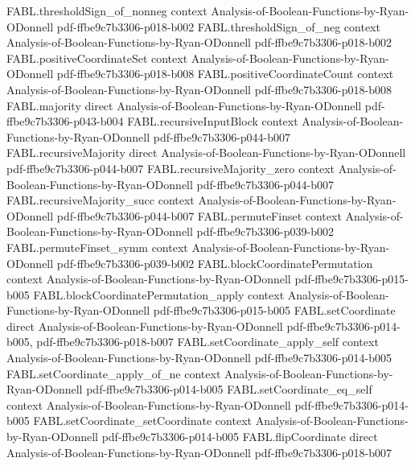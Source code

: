 \begin{theorem}
  {FABL.thresholdSign_of_nonneg}
  {context}
  {Analysis-of-Boolean-Functions-by-Ryan-ODonnell}
  {pdf-ffbe9c7b3306-p018-b002}
\proofstep
  {FABL.thresholdSign_of_neg}
  {context}
  {Analysis-of-Boolean-Functions-by-Ryan-ODonnell}
  {pdf-ffbe9c7b3306-p018-b002}
\proofstep
  {FABL.positiveCoordinateSet}
  {context}
  {Analysis-of-Boolean-Functions-by-Ryan-ODonnell}
  {pdf-ffbe9c7b3306-p018-b008}
\proofstep
  {FABL.positiveCoordinateCount}
  {context}
  {Analysis-of-Boolean-Functions-by-Ryan-ODonnell}
  {pdf-ffbe9c7b3306-p018-b008}
\proofstep
  {FABL.majority}
  {direct}
  {Analysis-of-Boolean-Functions-by-Ryan-ODonnell}
  {pdf-ffbe9c7b3306-p043-b004}
\proofstep
  {FABL.recursiveInputBlock}
  {context}
  {Analysis-of-Boolean-Functions-by-Ryan-ODonnell}
  {pdf-ffbe9c7b3306-p044-b007}
\proofstep
  {FABL.recursiveMajority}
  {direct}
  {Analysis-of-Boolean-Functions-by-Ryan-ODonnell}
  {pdf-ffbe9c7b3306-p044-b007}
\proofstep
  {FABL.recursiveMajority_zero}
  {context}
  {Analysis-of-Boolean-Functions-by-Ryan-ODonnell}
  {pdf-ffbe9c7b3306-p044-b007}
\proofstep
  {FABL.recursiveMajority_succ}
  {context}
  {Analysis-of-Boolean-Functions-by-Ryan-ODonnell}
  {pdf-ffbe9c7b3306-p044-b007}
\proofstep
  {FABL.permuteFinset}
  {context}
  {Analysis-of-Boolean-Functions-by-Ryan-ODonnell}
  {pdf-ffbe9c7b3306-p039-b002}
\proofstep
  {FABL.permuteFinset_symm}
  {context}
  {Analysis-of-Boolean-Functions-by-Ryan-ODonnell}
  {pdf-ffbe9c7b3306-p039-b002}
\proofstep
  {FABL.blockCoordinatePermutation}
  {context}
  {Analysis-of-Boolean-Functions-by-Ryan-ODonnell}
  {pdf-ffbe9c7b3306-p015-b005}
\proofstep
  {FABL.blockCoordinatePermutation_apply}
  {context}
  {Analysis-of-Boolean-Functions-by-Ryan-ODonnell}
  {pdf-ffbe9c7b3306-p015-b005}
\proofstep
  {FABL.setCoordinate}
  {direct}
  {Analysis-of-Boolean-Functions-by-Ryan-ODonnell}
  {pdf-ffbe9c7b3306-p014-b005,
    pdf-ffbe9c7b3306-p018-b007}
\proofstep
  {FABL.setCoordinate_apply_self}
  {context}
  {Analysis-of-Boolean-Functions-by-Ryan-ODonnell}
  {pdf-ffbe9c7b3306-p014-b005}
\proofstep
  {FABL.setCoordinate_apply_of_ne}
  {context}
  {Analysis-of-Boolean-Functions-by-Ryan-ODonnell}
  {pdf-ffbe9c7b3306-p014-b005}
\proofstep
  {FABL.setCoordinate_eq_self}
  {context}
  {Analysis-of-Boolean-Functions-by-Ryan-ODonnell}
  {pdf-ffbe9c7b3306-p014-b005}
\proofstep
  {FABL.setCoordinate_setCoordinate}
  {context}
  {Analysis-of-Boolean-Functions-by-Ryan-ODonnell}
  {pdf-ffbe9c7b3306-p014-b005}
\proofstep
  {FABL.flipCoordinate}
  {direct}
  {Analysis-of-Boolean-Functions-by-Ryan-ODonnell}
  {pdf-ffbe9c7b3306-p018-b007}
\proofstep

\end{theorem}
